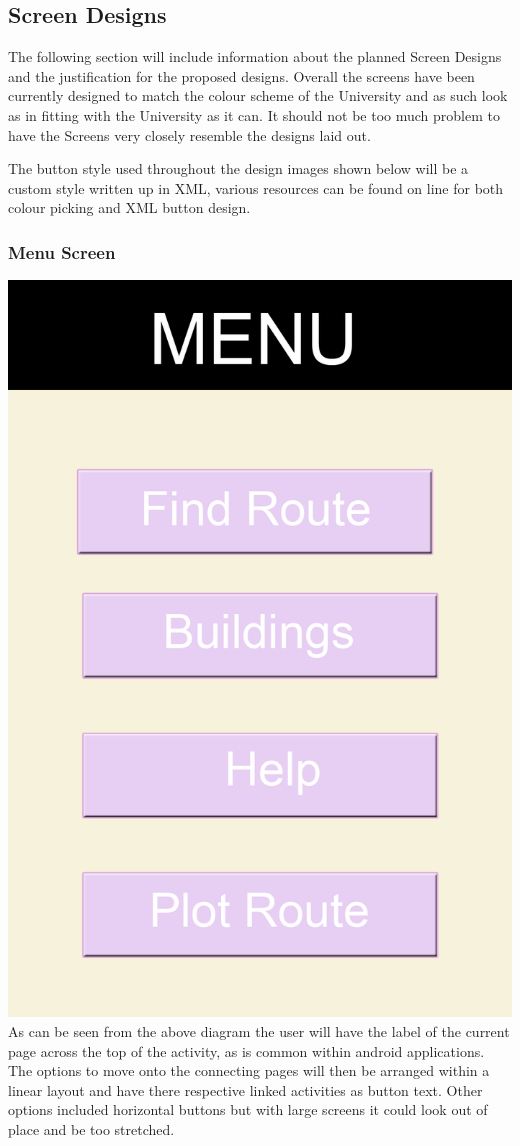 \subsection{Screen Designs}
The following section will include information about the planned Screen Designs and the justification for the proposed designs. Overall the screens have been currently designed to match the colour scheme of the University and as such look as in fitting with the University as it can. It should not be too much problem to have the Screens very closely resemble the designs laid out. 

The button style used throughout the design images shown below will be a custom style written up in XML, various resources can be found on line for both colour picking and XML button design. 
\subsubsection{Menu Screen}

\includegraphics[scale=0.6]{Design/Menu.png}\\
As can be seen from the above diagram the user will have the label of the current page across the top of the activity, as is common within android applications. The options to move onto the connecting pages will then be arranged within a linear layout and have there respective linked activities as button text. Other options included horizontal buttons but with large screens it could look out of place and be too stretched.

